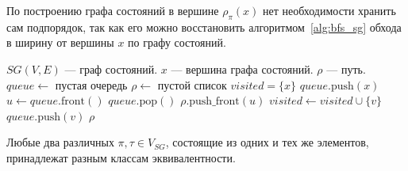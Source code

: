 По построению графа состояний в вершине $\rho_{\pi}(x)$ нет
необходимости хранить сам подпорядок, так как его можно восстановить
алгоритмом~\ref{alg:bfs_sg} обхода в ширину от вершины $x$ по графу состояний.

\begin{algorithm}[H]
  \caption{Построение пути по графу состояний}
  \label{alg:bfs_sg}
  \begin{algorithmic}[1]
    \Require $SG(V, E)$ — граф состояний.
    \Require $x$ — вершина графа состояний.
    \Ensure $\rho$ — путь.
    \State $queue \gets$ пустая очередь
    \State $\rho \gets$ пустой список
    \State $visited = \{x\}$
    \State $queue.\text{push}(x)$
    \State $u \gets queue.\text{front}()$
    \State $queue.\text{pop}()$
    \State $\rho.\text{push\_front}(u)$
    \State $visited \gets visited \cup \{v\}$
    \State $queue.\text{push}(v)$
    \EndIf
    \EndFor
    \EndWhile
    \State \Return $\rho$
    \EndFunction
  \end{algorithmic}
\end{algorithm}

\begin{lemma}
  Любые два различных $\pi, \tau \in V_{SG}$, состоящие из одних и
  тех же элементов, принадлежат разным классам эквивалентности.
  \label{lm:path-unique}
\end{lemma}

